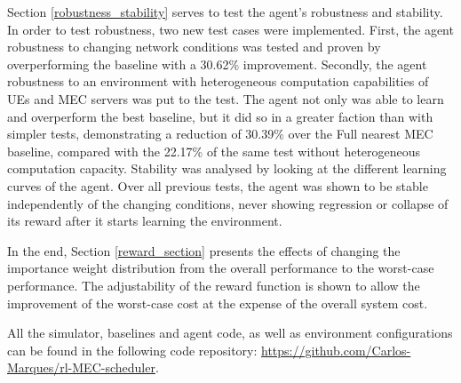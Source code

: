 Section \ref{robustness_stability} serves to test the agent's robustness and stability. In order to test robustness, two new test cases were implemented. First, the agent robustness to changing network conditions was tested and proven by overperforming the baseline with a 30.62\% improvement. Secondly, the agent robustness to an environment with heterogeneous computation capabilities of \acrshort{UE}s and \acrshort{MEC} servers was put to the test. The agent not only was able to learn and overperform the best baseline, but it did so in a greater faction than with simpler tests, demonstrating a reduction of 30.39\% over the Full nearest MEC baseline, compared with the 22.17\% of the same test without heterogeneous computation capacity. Stability was analysed by looking at the different learning curves of the agent. Over all previous tests, the agent was shown to be stable independently of the changing conditions, never showing regression or collapse of its reward after it starts learning the environment.

In the end, Section \ref{reward_section} presents the effects of changing the importance weight distribution from the overall performance to the worst-case performance. The adjustability of the reward function is shown to allow the improvement of the worst-case cost at the expense of the overall system cost.

All the simulator, baselines and agent code, as well as environment configurations can be found in the following code repository:
\href{https://github.com/Carlos-Marques/rl-MEC-scheduler}{https://github.com/Carlos-Marques/rl-MEC-scheduler}.

